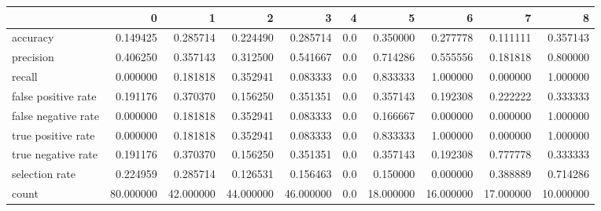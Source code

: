 \begin{tabular}{lrrrrrrrrr}
\toprule
{} &          0 &          1 &          2 &          3 &    4 &          5 &          6 &          7 &          8 \\
\midrule
accuracy            &   0.149425 &   0.285714 &   0.224490 &   0.285714 &  0.0 &   0.350000 &   0.277778 &   0.111111 &   0.357143 \\
precision           &   0.406250 &   0.357143 &   0.312500 &   0.541667 &  0.0 &   0.714286 &   0.555556 &   0.181818 &   0.800000 \\
recall              &   0.000000 &   0.181818 &   0.352941 &   0.083333 &  0.0 &   0.833333 &   1.000000 &   0.000000 &   1.000000 \\
false positive rate &   0.191176 &   0.370370 &   0.156250 &   0.351351 &  0.0 &   0.357143 &   0.192308 &   0.222222 &   0.333333 \\
false negative rate &   0.000000 &   0.181818 &   0.352941 &   0.083333 &  0.0 &   0.166667 &   0.000000 &   0.000000 &   1.000000 \\
true positive rate  &   0.000000 &   0.181818 &   0.352941 &   0.083333 &  0.0 &   0.833333 &   1.000000 &   0.000000 &   1.000000 \\
true negative rate  &   0.191176 &   0.370370 &   0.156250 &   0.351351 &  0.0 &   0.357143 &   0.192308 &   0.777778 &   0.333333 \\
selection rate      &   0.224959 &   0.285714 &   0.126531 &   0.156463 &  0.0 &   0.150000 &   0.000000 &   0.388889 &   0.714286 \\
count               &  80.000000 &  42.000000 &  44.000000 &  46.000000 &  0.0 &  18.000000 &  16.000000 &  17.000000 &  10.000000 \\
\bottomrule
\end{tabular}
